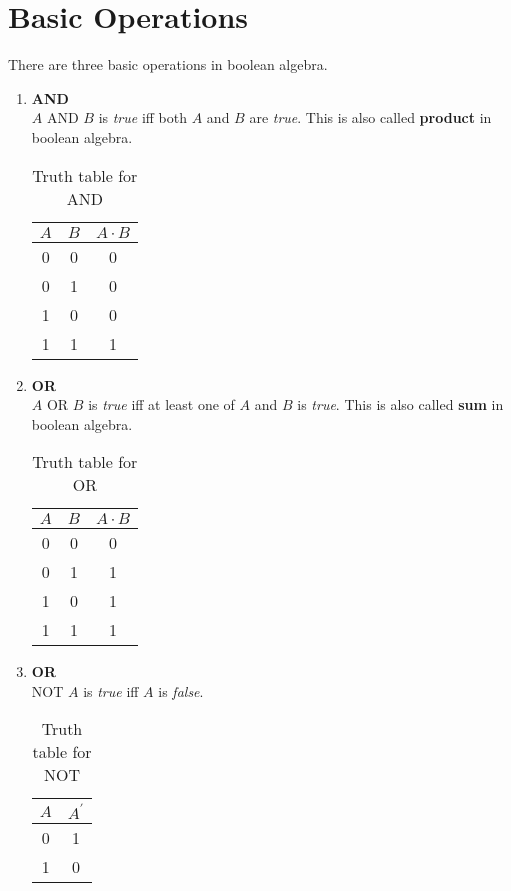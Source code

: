 \documentclass[oneside]{book}
\begin{document}
\section{Basic Operations}
\label{basic_boolean_operations_section}
There are three basic operations in boolean algebra.
\begin{enumerate}
	\item \textbf{AND}\\
	      \(A\) {AND} \(B\) is \textit{true} iff both \(A\) and \(B\) are \textit{true}. This is also called \textbf{product} in boolean algebra.
	      \begin{table}[ht]
		      \centering
		      \begin{tabular}{|cc|c|}
			      \hline
			      $A$ & $B$ & $A\cdot B$ \\
			      \hline
			      0   & 0   & 0          \\
			      0   & 1   & 0          \\
			      1   & 0   & 0          \\
			      1   & 1   & 1          \\
			      \hline
		      \end{tabular}
		      \caption{Truth table for AND}
		      \label{truth_table_for_and}
	      \end{table}
	\item \textbf{OR}\\
	      \(A\) {OR} \(B\) is \textit{true} iff at least one of \(A\) and \(B\) is \textit{true}. This is also called \textbf{sum} in boolean algebra.
	      \begin{table}[ht]
		      \centering
		      \begin{tabular}{|cc|c|}
			      \hline
			      $A$ & $B$ & $A\cdot B$ \\
			      \hline
			      0   & 0   & 0          \\
			      0   & 1   & 1          \\
			      1   & 0   & 1          \\
			      1   & 1   & 1          \\
			      \hline
		      \end{tabular}
		      \caption{Truth table for OR}
		      \label{truth_table_for_or}
	      \end{table}
	\item \textbf{OR}\\
	      NOT \(A\) is \textit{true} iff \(A\) is \textit{false}.
	      \begin{table}[ht]
		      \centering
		      \begin{tabular}{|c|c|}
			      \hline
			      $A$ & $A^\prime$ \\
			      \hline
			      0   & 1          \\
			      1   & 0          \\
			      \hline
		      \end{tabular}
		      \caption{Truth table for NOT}
		      \label{truth_table_for_not}
	      \end{table}
\end{enumerate}
\end{document}
